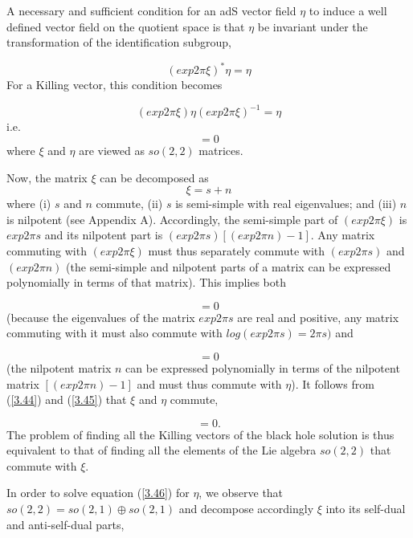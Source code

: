 \documentclass[12pt]{article}
\newcounter{c1} \newcounter{c2}
\newcommand{\bb}{\begin{equation}}
\begin{document}
A necessary and sufficient condition for an adS vector field $\eta$ to
induce a
 well defined vector field on the quotient space is that $\eta$ be invariant
 under the transformation of the identification subgroup,

\bb
(exp 2 \pi \xi)^\ast \eta = \eta
\label{3.40}
\end{equation}
%
For a Killing vector, this condition becomes

\bb
(exp 2 \pi \xi) \eta (exp 2 \pi \xi)^{-1} = \eta
\label{3.41}
\end{equation}
%
i.e.
\bb
[exp 2 \pi \xi, \eta] = 0
\label{3.42}
\end{equation}
%
where $\xi$ and $\eta$ are viewed as $so(2,2)$ matrices.

Now, the matrix $\xi$ can be decomposed as
\bb
\xi = s + n
\label{3.43}
\end{equation}
%
where (i) $s$ and $n$ commute, (ii) $s$ is semi-simple with real eigenvalues;
and (iii) $n$ is nilpotent (see Appendix A). Accordingly, the semi-simple part
of $(exp 2\pi \xi)$ is $exp 2 \pi s$ and its nilpotent part is $(exp2 \pi s)
[(exp 2 \pi n) - 1]$. Any matrix commuting with $(exp2 \pi \xi)$ must thus
separately commute with $(exp2 \pi s)$ and $(exp2 \pi n)$ (the semi-simple and
nilpotent parts of a matrix can be expressed polynomially in terms of that
matrix). This implies both

\bb
[s ,\eta] = 0
\label{3.44}
\end{equation}
%
(because the eigenvalues of the matrix $exp2 \pi s$ are real and positive, any
matrix commuting with it must also commute with $log(exp2 \pi s) = 2 \pi s)$
and

\bb
[n, \eta] = 0
\label{3.45}
\end{equation}
%
(the nilpotent matrix $n$ can be expressed polynomially in
terms of the nilpotent matrix $[(exp2 \pi n) - 1]$ and must thus
commute with $\eta$). It follows from (\ref{3.44}) and
(\ref{3.45}) that $\xi$ and $\eta$ commute,

\bb
[\xi, \ \eta] = 0.
\label{3.46}
\end{equation}
%
The problem of finding all the Killing vectors of the black
hole solution is thus equivalent to that of finding all the
elements of the Lie algebra $so(2,2)$ that commute with $\xi$.

In order to solve equation (\ref{3.46}) for $\eta$, we observe
that $so(2,2) = so(2,1) \oplus so(2,1)$ and decompose
accordingly $\xi$ into its self-dual and anti-self-dual parts,
\end{document}
